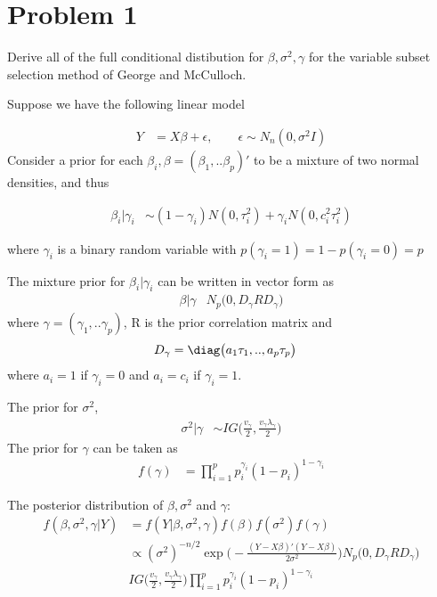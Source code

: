 
\section{Problem 1}
Derive all of the full conditional distibution for $\beta, \sigma^2, \gamma$ for the variable subset selection method of George and McCulloch.

Suppose we have the following linear model

\begin{align*}
	Y & = X\beta + \epsilon, \qquad \epsilon \sim N_n(0, \sigma^2 I)
 \end{align*}
Consider a prior for each $\beta_i, \beta= (\beta_1,..\beta_p)'$ to be a mixture of two normal densities, and thus

\begin{align*}
	\beta_i| \gamma_i & \sim (1- \gamma_i) N(0, \tau_i^2) + \gamma_i N(0, c_i^2 \tau_i^2)
 \end{align*}

where $\gamma_i$ is a binary random variable with $p(\gamma_i=1) = 1- p(\gamma_i=0) = p$

The mixture prior for $\beta_i | \gamma_i$ can be written in vector form as 
\begin{align*}
	\beta| \gamma &  N_p \big( 0, D_{\gamma} R D_{\gamma} \big) 
 \end{align*}
where $\gamma = (\gamma_1, .. \gamma_p)$, R is the prior correlation matrix and 
\begin{align*}
	D_{\gamma} &= \diag \big( a_1 \tau_1, .. , a_p \tau_p \big) 
 \end{align*}
where $ a_i = 1$ if $\gamma_i = 0$ and $ a_i = c_i $ if $\gamma_i = 1$.

The prior for $\sigma^2$, 
\begin{align*}
 \sigma^2 | \gamma & \sim IG \Big( \frac{v_{\gamma}}{2}, \frac{v_{\gamma} \lambda_{\gamma}}{2} \Big)
 \end{align*}
The prior for $\gamma$ can be taken as 
\begin{align*}
 f(\gamma) &= \prod_{i=1}^p p_i^{\gamma_i} (1- p_i)^{1- \gamma_i}
 \end{align*}

The posterior distribution of $\beta, \sigma^2$ and $\gamma$:
\begin{align*}
 f(\beta, \sigma^2, \gamma | Y) &=f(Y| \beta, \sigma^2, \gamma) f(\beta) f(\sigma^2) f(\gamma)\\
&\propto (\sigma^2)^{-n/2} \exp \big(-\frac{(Y- X \beta)'(Y- X \beta)}{2 \sigma^2} \big)  N_p \big( 0, D_{\gamma} R D_{\gamma} \big)\\
& IG \Big( \frac{v_{\gamma}}{2}, \frac{v_{\gamma} \lambda_{\gamma}}{2} \Big) \prod_{i=1}^p p_i^{\gamma_i} (1- p_i)^{1- \gamma_i}
 \end{align*}

